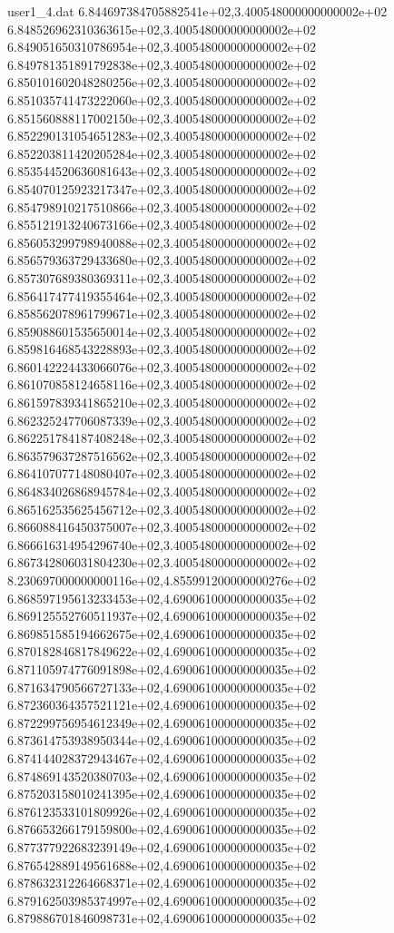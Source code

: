 \begin{filecontents}{user1_4.dat}
6.844697384705882541e+02,3.400548000000000002e+02
6.848526962310363615e+02,3.400548000000000002e+02
6.849051650310786954e+02,3.400548000000000002e+02
6.849781351891792838e+02,3.400548000000000002e+02
6.850101602048280256e+02,3.400548000000000002e+02
6.851035741473222060e+02,3.400548000000000002e+02
6.851560888117002150e+02,3.400548000000000002e+02
6.852290131054651283e+02,3.400548000000000002e+02
6.852203811420205284e+02,3.400548000000000002e+02
6.853544520636081643e+02,3.400548000000000002e+02
6.854070125923217347e+02,3.400548000000000002e+02
6.854798910217510866e+02,3.400548000000000002e+02
6.855121913240673166e+02,3.400548000000000002e+02
6.856053299798940088e+02,3.400548000000000002e+02
6.856579363729433680e+02,3.400548000000000002e+02
6.857307689380369311e+02,3.400548000000000002e+02
6.856417477419355464e+02,3.400548000000000002e+02
6.858562078961799671e+02,3.400548000000000002e+02
6.859088601535650014e+02,3.400548000000000002e+02
6.859816468543228893e+02,3.400548000000000002e+02
6.860142224433066076e+02,3.400548000000000002e+02
6.861070858124658116e+02,3.400548000000000002e+02
6.861597839341865210e+02,3.400548000000000002e+02
6.862325247706087339e+02,3.400548000000000002e+02
6.862251784187408248e+02,3.400548000000000002e+02
6.863579637287516562e+02,3.400548000000000002e+02
6.864107077148080407e+02,3.400548000000000002e+02
6.864834026868945784e+02,3.400548000000000002e+02
6.865162535625456712e+02,3.400548000000000002e+02
6.866088416450375007e+02,3.400548000000000002e+02
6.866616314954296740e+02,3.400548000000000002e+02
6.867342806031804230e+02,3.400548000000000002e+02
8.230697000000000116e+02,4.855991200000000276e+02
6.868597195613233453e+02,4.690061000000000035e+02
6.869125552760511937e+02,4.690061000000000035e+02
6.869851585194662675e+02,4.690061000000000035e+02
6.870182846817849622e+02,4.690061000000000035e+02
6.871105974776091898e+02,4.690061000000000035e+02
6.871634790566727133e+02,4.690061000000000035e+02
6.872360364357521121e+02,4.690061000000000035e+02
6.872299756954612349e+02,4.690061000000000035e+02
6.873614753938950344e+02,4.690061000000000035e+02
6.874144028372943467e+02,4.690061000000000035e+02
6.874869143520380703e+02,4.690061000000000035e+02
6.875203158010241395e+02,4.690061000000000035e+02
6.876123533101809926e+02,4.690061000000000035e+02
6.876653266179159800e+02,4.690061000000000035e+02
6.877377922683239149e+02,4.690061000000000035e+02
6.876542889149561688e+02,4.690061000000000035e+02
6.878632312264668371e+02,4.690061000000000035e+02
6.879162503985374997e+02,4.690061000000000035e+02
6.879886701846098731e+02,4.690061000000000035e+02

\end{filecontents}
